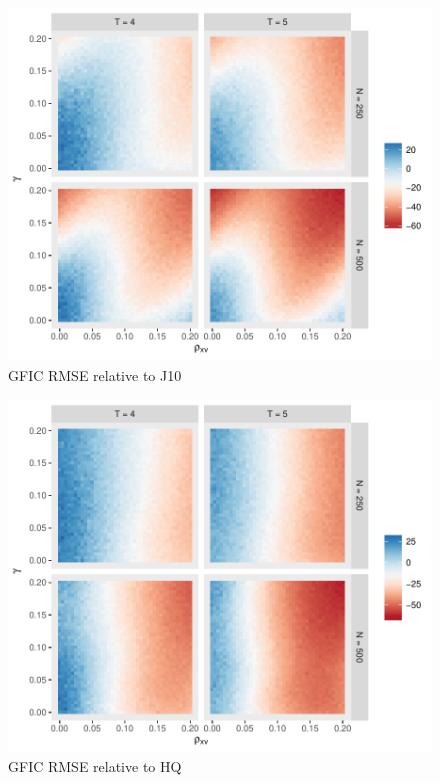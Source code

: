 \begin{figure}
\centering
\includegraphics[scale = 0.8]{./simulations/DynamicPanel/results/Dpanel_GFIC_RMSE_rel_J10}
\caption{GFIC RMSE relative to J10}
\end{figure}

\begin{figure}
\centering
\includegraphics[scale = 0.8]{./simulations/DynamicPanel/results/Dpanel_GFIC_RMSE_rel_HQ}
\caption{GFIC RMSE relative to HQ}
\end{figure}


